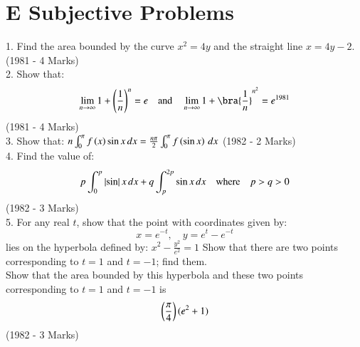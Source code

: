 \documentclass[journal,12pt,twocolumn]{IEEEtran}
\theoremstyle{remark}
\begin{document}
\section*{E Subjective Problems}
1. Find the area bounded by the curve $ x^2 = 4y $ and the straight line $ x = 4y - 2 $. \hfill (1981 - 4 Marks) \\
2. Show that:
\begin{align*}
\lim_{n \to \infty} 1 +\brak{\frac{1}{n}}^n = e \quad \text{and} \quad \lim_{n \to \infty} 1 + \bra{\frac{1}{n}}^{n^2} = e^{1981}
\end{align*}
\hfill (1981 - 4 Marks) \\
3. Show that:
$n \int_0^\pi f\left(x\right) \sin x \, dx = \frac{n\pi}{2} \int_0^\pi f\left(\sin x\right) \, dx$
\hfill (1982 - 2 Marks) \\
4. Find the value of:
\begin{align*}
    p \int_0^p \left\vert\sin\right\vert x \, dx + q \int_p^{2p} \sin x \, dx \quad \text{where} \quad p > q > 0
\end{align*}
\hfill (1982 - 3 Marks) \\
5. For any real $ t $, show that the point with coordinates given by:
$$x = e^{-t}, \quad y = e^{t} - e^{-t}$$
lies on the hyperbola defined by:
$x^2 - \frac{y^2}{e^2} = 1$
Show that there are two points corresponding to  $t=1 $ and $ t=-1 $; find them.\\
Show that the area bounded by this hyperbola and these two points corresponding to $ t=1$ and $ t=-1 $ is \\
$$\left(\frac{\pi}{4}\right)(e^2 + 1)$$
\hfill  (1982 - 3 Marks)
\end{document}
